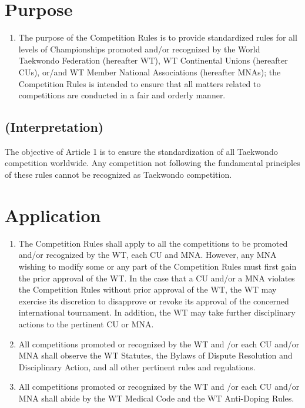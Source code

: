 \documentclass[
]{report}
\author{}
\date{}
\providecommand{\tightlist}{%
  \setlength{\itemsep}{0pt}\setlength{\parskip}{0pt}}
\newenvironment{spec}[0]{\footnotesize}{\normalsize}
\begin{document}
\chapter{Purpose}\label{purpose}

\begin{enumerate}
\tightlist
\item
  The purpose of the Competition Rules is to provide standardized rules
  for all levels of Championships promoted and/or recognized by the
  World Taekwondo Federation (hereafter WT), WT Continental Unions
  (hereafter CUs), or/and WT Member National Associations (hereafter
  MNAs); the Competition Rules is intended to ensure that all matters
  related to competitions are conducted in a fair and orderly manner.
\end{enumerate}

\section{(Interpretation)}\label{interpretation}

\begin{spec}

The objective of Article 1 is to ensure the standardization of all
Taekwondo competition worldwide. Any competition not following the
fundamental principles of these rules cannot be recognized as Taekwondo
competition.

\end{spec}

\chapter{Application}\label{application}

\begin{enumerate}
\item
  The Competition Rules shall apply to all the competitions to be
  promoted and/or recognized by the WT, each CU and MNA. However, any
  MNA wishing to modify some or any part of the Competition Rules must
  first gain the prior approval of the WT. In the case that a CU and/or
  a MNA violates the Competition Rules without prior approval of the WT,
  the WT may exercise its discretion to disapprove or revoke its
  approval of the concerned international tournament. In addition, the
  WT may take further disciplinary actions to the pertinent CU or MNA.
\item
  All competitions promoted or recognized by the WT and /or each CU
  and/or MNA shall observe the WT Statutes, the Bylaws of Dispute
  Resolution and Disciplinary Action, and all other pertinent rules and
  regulations.
\item
  All competitions promoted or recognized by the WT and /or each CU
  and/or MNA shall abide by the WT Medical Code and the WT Anti-Doping
  Rules.
\end{enumerate}
\end{document}

